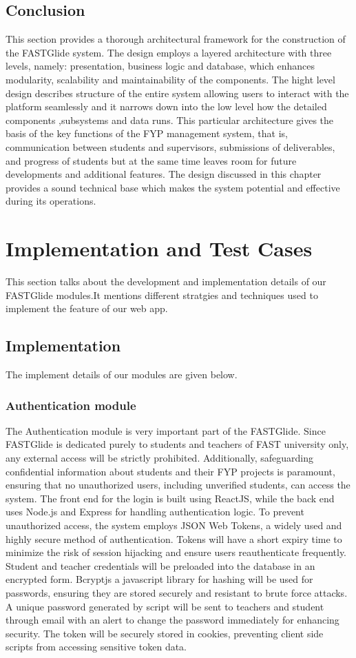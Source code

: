 \documentclass{FastFyp}
\begin{document}
\section{Conclusion}
This section provides a thorough architectural framework for the construction of the FASTGlide system. The design employs a layered architecture with three levels, namely: presentation, business logic and database, which enhances modularity, scalability and maintainability of the components. The hight level design describes structure of the entire system allowing users to interact with the platform seamlessly and it narrows down into the low level how the detailed components ,subsystems and data runs. This particular architecture gives the basis of the key functions of the FYP management system, that is, communication between students and supervisors, submissions of deliverables, and progress of students but at the same time leaves room for future developments and additional features. The design discussed in this chapter provides a sound technical base which makes the system potential and effective during its operations.


\chapter{Implementation and Test Cases}
This section talks about the development and implementation details of our FASTGlide modules.It mentions different stratgies and techniques used to implement the feature of our web app.

\section{Implementation}
The implement details of our modules are given below.

\subsection{Authentication module}
The Authentication module is very important part of the FASTGlide. Since FASTGlide is dedicated purely to students and teachers of FAST university only, any external access will be strictly prohibited. Additionally, safeguarding confidential information about students and their FYP projects is paramount, ensuring that no unauthorized users, including unverified students, can access the system.
The front end for the login is built using ReactJS, while the back end uses Node.js and Express for handling authentication logic. To prevent unauthorized access, the system employs JSON Web Tokens, a widely used and highly secure method of authentication. Tokens will have a short expiry time to minimize the risk of session hijacking and ensure users reauthenticate frequently.
Student and teacher credentials will be preloaded into the database in an encrypted form. Bcryptjs a javascript library for hashing will be used for passwords, ensuring they are stored securely and resistant to brute force attacks. A unique password generated by script will be sent to teachers and student through email with an alert to change the password immediately for enhancing security. The token will be securely stored in cookies, preventing client side scripts from accessing sensitive token data.
\end{document}
